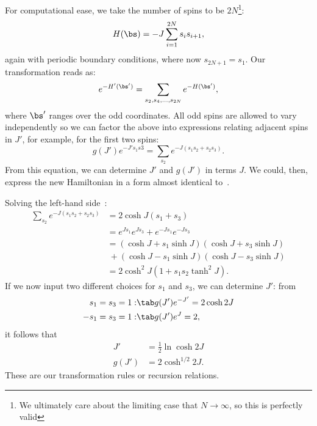 For computational ease, we take the number of spins to be
$2N$\footnote{We ultimately care about the limiting case that
  $N\rightarrow\infty$, so this is perfectly valid}:%
\begin{equation}%
  H(\bs)=-J\sum_{i=1}^{2N} s_i s_{i+1},
  \label{eq:ising-energy-fn-0-field}
\end{equation}%
again with periodic boundary conditions, where now $s_{2N+1}=s_1$. Our
transformation reads as:
\begin{equation}%
  e^{-H'(\bs')}=\sum_{s_2,s_4,\dots,s_{2N}} e^{-H(\bs')},
  \label{eq:decimation-transformation}
\end{equation}%
where $\bs'$ ranges over the odd coordinates. All odd spins are
allowed to vary independently so we can factor the above into
expressions relating adjacent spins in $J'$, for example, for the
first two spins:
\begin{equation}%
  g(J')e^{-J's_1 s3}=\sum_{s_2} e^{-J (s_1s_2+s_2s_3)}.
\end{equation}%
From this equation, we can determine $J'$ and $g(J')$ in terms $J$. We
could, then, express the new Hamiltonian in a form almost identical
to~.

Solving the left-hand side~\cite{domb}: %
\begin{align}%
  \sum_{s_2} e^{-J (s_1s_2+s_2s_3)}&=2 \cosh {J (s_1+s_3)}\\
                                   &=e^{Js_1}e^{Js_3}+e^{-Js_1}e^{-Js_3}\\
                                   &=(\cosh J+s_1\sinh J)(\cosh J+s_3\sinh J)\\
                                   &\ +(\cosh J-s_1\sinh J)(\cosh J-s_3\sinh J)\\
                                   &=2\cosh^2 J(1+s_1s_2 \tanh^2 J).
\end{align}%
If we now input two different choices for $s_1$ and $s_3$, we can
determine $J'$: from %
\begin{align}%
  s_1=s_3=1:&\tab g(J')e^{-J'}=2\cosh 2J\\
  -s_1=s_3=1:&\tab g(J')e^{J}=2,
\end{align}%
it follows that %
\begin{align}%
  J'&= \frac{1}{2}\ln \cosh 2J \label{eq:ising-1d-recursion-relation-J}\\
  g(J')&=2\cosh^{1/2} 2J. \label{eq:ising-1d-recursion-relation-f}
\end{align}%
These are our transformation rules or recursion relations.


